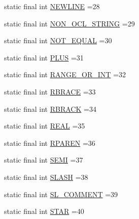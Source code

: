 \begin{DoxyCompactItemize}
\item 
static final int \hyperlink{classorg_1_1tzi_1_1use_1_1parser_1_1shell_1_1_shell_command_parser_a28c520db9c13c98569da8afe6bfb0395}{N\-E\-W\-L\-I\-N\-E} =28
\item 
static final int \hyperlink{classorg_1_1tzi_1_1use_1_1parser_1_1shell_1_1_shell_command_parser_a0070a9bd329bf4555bb81125263a5196}{N\-O\-N\-\_\-\-O\-C\-L\-\_\-\-S\-T\-R\-I\-N\-G} =29
\item 
static final int \hyperlink{classorg_1_1tzi_1_1use_1_1parser_1_1shell_1_1_shell_command_parser_a2d6d9a5ae5976572ea1e21d85c703aa4}{N\-O\-T\-\_\-\-E\-Q\-U\-A\-L} =30
\item 
static final int \hyperlink{classorg_1_1tzi_1_1use_1_1parser_1_1shell_1_1_shell_command_parser_a48aafd6eccb1cdfc635698fbfa8a4eeb}{P\-L\-U\-S} =31
\item 
static final int \hyperlink{classorg_1_1tzi_1_1use_1_1parser_1_1shell_1_1_shell_command_parser_a65ee5c52c3c24904421cc76dc10439ab}{R\-A\-N\-G\-E\-\_\-\-O\-R\-\_\-\-I\-N\-T} =32
\item 
static final int \hyperlink{classorg_1_1tzi_1_1use_1_1parser_1_1shell_1_1_shell_command_parser_a564bbbbe693e52fcd6192ab5bf8c9eb1}{R\-B\-R\-A\-C\-E} =33
\item 
static final int \hyperlink{classorg_1_1tzi_1_1use_1_1parser_1_1shell_1_1_shell_command_parser_aef419100c59c1f618950355d0333def8}{R\-B\-R\-A\-C\-K} =34
\item 
static final int \hyperlink{classorg_1_1tzi_1_1use_1_1parser_1_1shell_1_1_shell_command_parser_a72b2182f3046d3b1677f77a72c633dbf}{R\-E\-A\-L} =35
\item 
static final int \hyperlink{classorg_1_1tzi_1_1use_1_1parser_1_1shell_1_1_shell_command_parser_a0ac9b927f080251703b7ce3692a9a5c4}{R\-P\-A\-R\-E\-N} =36
\item 
static final int \hyperlink{classorg_1_1tzi_1_1use_1_1parser_1_1shell_1_1_shell_command_parser_a87d19402b2b3e007a46f9d49d33b505e}{S\-E\-M\-I} =37
\item 
static final int \hyperlink{classorg_1_1tzi_1_1use_1_1parser_1_1shell_1_1_shell_command_parser_afa9e2f4114360f820d8d478aa85abd10}{S\-L\-A\-S\-H} =38
\item 
static final int \hyperlink{classorg_1_1tzi_1_1use_1_1parser_1_1shell_1_1_shell_command_parser_a551dbdbfe81ee7d03c95aec6f4b99fc0}{S\-L\-\_\-\-C\-O\-M\-M\-E\-N\-T} =39
\item 
static final int \hyperlink{classorg_1_1tzi_1_1use_1_1parser_1_1shell_1_1_shell_command_parser_acb85303c7373f87c7469715cb4bd6f15}{S\-T\-A\-R} =40

\end{DoxyCompactItemize}
